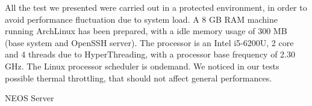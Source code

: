\label{appendix:testenv}

All the test we presented were carried out in a protected environment, in order
to avoid performance fluctuation due to system load. A 8 GB RAM machine running
ArchLinux has been prepared, with a idle memory usage of 300 MB (base system and
OpenSSH server). The processor is an Intel i5-6200U, 2 core and 4 threads due to
HyperThreading, with a processor base frequency of 2.30 GHz. The Linux processor
scheduler is ondemand. We noticed in our tests possible thermal throttling, that
should not affect general performances.

NEOS Server
\citep{czyzyk1998neos}
